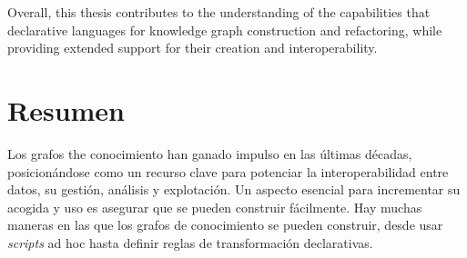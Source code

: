 Overall, this thesis contributes to the understanding of the capabilities that declarative languages for knowledge graph construction and refactoring, while providing extended support for their creation and interoperability. 








\cleardoublepage
\section*{Resumen}
\label{sec::resumen}



Los grafos the conocimiento han ganado impulso en las últimas décadas, posicionándose como un recurso clave para potenciar la interoperabilidad entre datos, su gestión, análisis y explotación. Un aspecto esencial para incrementar su acogida y uso es asegurar que se pueden construir fácilmente. Hay muchas maneras en las que los grafos de conocimiento se pueden construir, desde usar \textit{scripts} ad hoc hasta definir reglas de transformación declarativas. 

